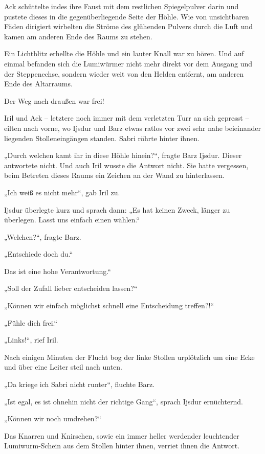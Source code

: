 Ack schüttelte indes ihre Faust mit dem restlichen Spiegelpulver darin und pustete dieses in die gegenüberliegende Seite der Höhle. Wie von unsichtbaren Fäden dirigiert wirbelten die Ströme des glühenden Pulvers durch die Luft und kamen am anderen Ende des Raums zu stehen.

Ein Lichtblitz erhellte die Höhle und ein lauter Knall war zu hören. Und auf einmal befanden sich die Lumiwürmer nicht mehr direkt vor dem Ausgang und der Steppenechse, sondern wieder weit von den Helden entfernt, am anderen Ende des Altarraums.

Der Weg nach draußen war frei!

Iril und Ack – letztere noch immer mit dem verletzten Turr an sich gepresst – eilten nach vorne, wo Ijsdur und Barz etwas ratlos vor zwei sehr nahe beieinander liegenden Stolleneingängen standen. Sabri röhrte hinter ihnen.

„Durch welchen kamt ihr in diese Höhle hinein?“, fragte Barz Ijsdur. Dieser antwortete nicht. Und auch Iril wusste die Antwort nicht. Sie hatte vergessen, beim Betreten dieses Raums ein Zeichen an der Wand zu hinterlassen.

„Ich weiß es nicht mehr“, gab Iril zu.

Ijsdur überlegte kurz und sprach dann: „Es hat keinen Zweck, länger zu überlegen. Lasst uns einfach einen wählen.“

„Welchen?“, fragte Barz.

„Entschiede doch du.“

Das ist eine hohe Verantwortung.“

„Soll der Zufall lieber entscheiden lassen?“

„Können wir einfach möglichst schnell eine Entscheidung treffen?!“

„Fühle dich frei.“

„Links!“, rief Iril.\bigskip







Nach einigen Minuten der Flucht bog der linke Stollen urplötzlich um eine Ecke und über eine Leiter steil nach unten.

„Da kriege ich Sabri nicht runter“, fluchte Barz.

„Ist egal, es ist ohnehin nicht der richtige Gang“, sprach Ijsdur ernüchternd.

„Können wir noch umdrehen?“

Das Knarren und Knirschen, sowie ein immer heller werdender leuchtender Lumiwurm-Schein aus dem Stollen hinter ihnen, verriet ihnen die Antwort.

